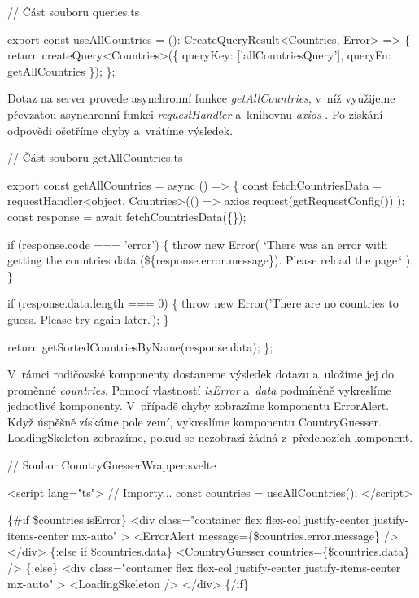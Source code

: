 \begin{prog}
// Část souboru queries.ts

export const useAllCountries = (): CreateQueryResult<Countries, Error> => \{
  return createQuery<Countries>(\{
    queryKey: ['allCountriesQuery'], queryFn: getAllCountries
  \});
\};
\end{prog}

Dotaz na server provede asynchronní funkce \emph{getAllCountries}, v~níž využijeme převzatou asynchronní funkci \emph{requestHandler} \cite{axiosrequesthandler} a~knihovnu \emph{axios} \cite{axioslib}. 
Po získání odpovědi ošetříme chyby a~vrátíme výsledek.

\begin{prog}
// Část souboru getAllCountries.ts

export const getAllCountries = async () => \{
  const fetchCountriesData = requestHandler<object, Countries>(() =>
    axios.request(getRequestConfig())
  );
  const response = await fetchCountriesData(\{\});

  if (response.code === 'error') \{
    throw new Error(
      `There was an error with getting the countries data 
      (\$\{response.error.message\}). Please reload the page.`
    );
  \}

  if (response.data.length === 0) \{
    throw new Error('There are no countries to guess. Please try again later.');
  \}

  return getSortedCountriesByName(response.data);
\};
\end{prog}

V~rámci rodičovské komponenty dostaneme výsledek dotazu a~uložíme jej do proměnné \emph{countries}. Pomocí vlastností \emph{isError} a~\emph{data} podmíněně vykreslíme jednotlivé komponenty. 
V~případě chyby zobrazíme komponentu ErrorAlert. Když úspěšně získáme pole zemí, vykreslíme komponentu CountryGuesser. LoadingSkeleton zobrazíme, pokud se nezobrazí žádná z~předchozích komponent.

\begin{prog}
// Soubor CountryGuesserWrapper.svelte

<script lang="ts">
  // Importy...
  const countries = useAllCountries();
</script>

\{#if \$countries.isError\}
  <div 
    class="container flex flex-col justify-center justify-items-center mx-auto"
  >
    <ErrorAlert message=\{\$countries.error.message\} />
  </div>
\{:else if \$countries.data\}
  <CountryGuesser countries=\{\$countries.data\} />
\{:else\}
  <div 
    class="container flex flex-col justify-center justify-items-center mx-auto"
  >
    <LoadingSkeleton />
  </div>
\{/if\}
\end{prog}

